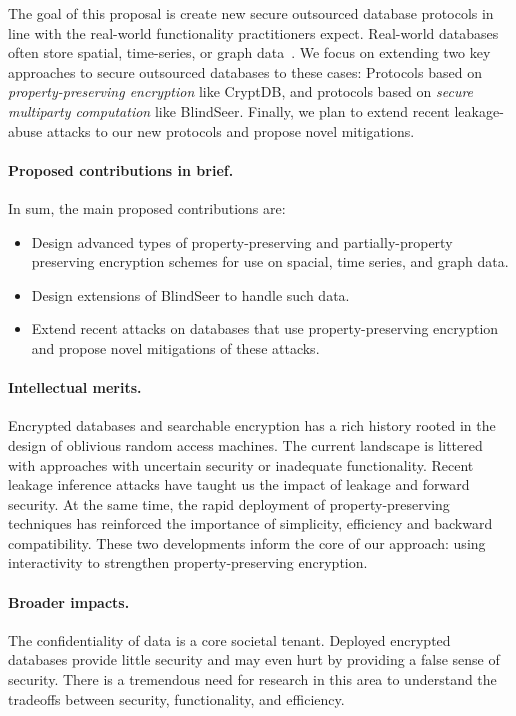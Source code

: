 The goal of this proposal is create new secure outsourced database protocols in line with the real-world functionality practitioners expect.  Real-world databases often store spatial, time-series, or graph data~\cite{SP:FVYSHG17}.  We focus on extending two key approaches to secure outsourced databases to these cases: Protocols based on \emph{property-preserving encryption} like CryptDB, and protocols based on \emph{secure multiparty computation} like BlindSeer.  Finally, we plan to extend recent leakage-abuse attacks to our new protocols and propose novel mitigations.


\paragraph*{Proposed contributions in brief.}
In sum, the main proposed contributions are:
\begin{itemize}
\item Design advanced types of property-preserving and partially-property preserving encryption schemes for use on spacial, time series, and graph data.
\item Design extensions of BlindSeer to handle such data.
\item Extend recent attacks on databases that use property-preserving encryption and propose novel mitigations of these attacks. 
\end{itemize}


\paragraph{Intellectual merits.}  
Encrypted databases and searchable encryption has a rich history rooted in the
design of oblivious random access machines.  The current landscape is littered
with approaches with uncertain security or inadequate functionality.  Recent
leakage inference attacks have taught us the impact of leakage and forward
security.  At the same time, the rapid deployment of property-preserving
techniques has reinforced the importance of simplicity, efficiency and backward
compatibility.  These two developments inform the core of our approach: using
interactivity to strengthen property-preserving encryption.

\paragraph{Broader impacts.}
The confidentiality of data is a core societal tenant.  Deployed encrypted
databases provide little security and may even hurt by providing a false sense
of security.  There is a tremendous need for research in this area to
understand the tradeoffs between security, functionality, and efficiency.

